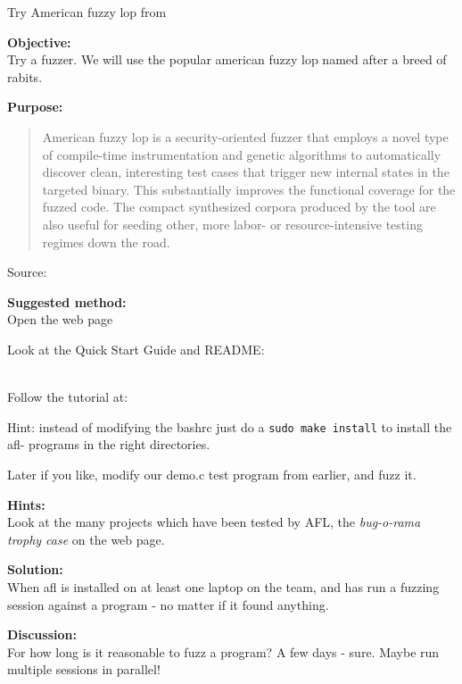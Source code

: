 \documentclass[a4paper,11pt,notitlepage]{report}
\begin{document}
Try American fuzzy lop from 

{\bf Objective:}\\
Try a fuzzer. We will use the popular american fuzzy lop named after a breed of rabits.


{\bf Purpose:}
\begin{quote}
American fuzzy lop is a security-oriented fuzzer that employs a novel type of compile-time instrumentation and genetic algorithms to automatically discover clean, interesting test cases that trigger new internal states in the targeted binary. This substantially improves the functional coverage for the fuzzed code. The compact synthesized corpora produced by the tool are also useful for seeding other, more labor- or resource-intensive testing regimes down the road.
\end{quote}
Source: 

{\bf Suggested method:}\\
Open the web page 

Look at the Quick Start Guide and README:\\
\\

Follow the tutorial at:\\

Hint: instead of modifying the bashrc just do a \verb+sudo make install+ to install the afl- programs in the right directories.

Later if you like, modify our demo.c test program from earlier, and fuzz it.

{\bf Hints:}\\
Look at the many projects which have been tested by AFL, the \emph{bug-o-rama trophy case} on the web page.

{\bf Solution:}\\
When afl is installed on at least one laptop on the team, and has run a fuzzing session against a program - no matter if it found anything.

{\bf Discussion:}\\
For how long is it reasonable to fuzz a program? A few days - sure. Maybe run multiple sessions in parallel!
\end{document}
